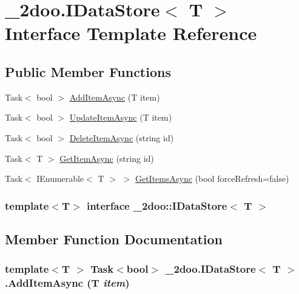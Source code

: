 \hypertarget{interface__2doo_1_1_i_data_store_3_01_t_01_4}{
\section{\_\-2doo.IDataStore$<$ T $>$ Interface Template Reference}
\label{interface__2doo_1_1_i_data_store_3_01_t_01_4}
}
\subsection*{Public Member Functions}
\begin{CompactItemize}
\item 
Task$<$ bool $>$ \hyperlink{interface__2doo_1_1_i_data_store_3_01_t_01_4_c7c14711ef80b7c7bbc5afd8d8e10acb}{AddItemAsync} (T item)
\item 
Task$<$ bool $>$ \hyperlink{interface__2doo_1_1_i_data_store_3_01_t_01_4_677f1700f44688366f898d3c86d97a32}{UpdateItemAsync} (T item)
\item 
Task$<$ bool $>$ \hyperlink{interface__2doo_1_1_i_data_store_3_01_t_01_4_505f00b79957746357809d59e74b3fbf}{DeleteItemAsync} (string id)
\item 
Task$<$ T $>$ \hyperlink{interface__2doo_1_1_i_data_store_3_01_t_01_4_d0162f5331b27ac6619a2960b52dfcbc}{GetItemAsync} (string id)
\item 
Task$<$ IEnumerable$<$ T $>$ $>$ \hyperlink{interface__2doo_1_1_i_data_store_3_01_t_01_4_a356c1924727c6c124ee35652905040b}{GetItemsAsync} (bool forceRefresh=false)
\end{CompactItemize}
\subsubsection*{template$<$T$>$ interface \_\-2doo::IDataStore$<$ T $>$}



\subsection{Member Function Documentation}
\hypertarget{interface__2doo_1_1_i_data_store_3_01_t_01_4_c7c14711ef80b7c7bbc5afd8d8e10acb}{
\subsubsection[{AddItemAsync}]{\setlength{\rightskip}{0pt plus 5cm}template$<$T $>$ Task$<$bool$>$ \_\-2doo.IDataStore$<$ T $>$.AddItemAsync (T {\em item})}}
\label{interface__2doo_1_1_i_data_store_3_01_t_01_4_c7c14711ef80b7c7bbc5afd8d8e10acb}


